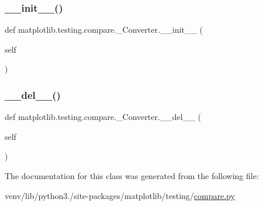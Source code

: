 \subsubsection{\texorpdfstring{\+\_\+\+\_\+init\+\_\+\+\_\+()}{\_\_init\_\_()}}
{\footnotesize\ttfamily def matplotlib.\+testing.\+compare.\+\_\+\+Converter.\+\_\+\+\_\+init\+\_\+\+\_\+ (\begin{DoxyParamCaption}\item[{}]{self }\end{DoxyParamCaption})}

\mbox{\label{classmatplotlib_1_1testing_1_1compare_1_1__Converter_a65e038b7478f498f342d8afc8e64fff7}} 
\subsubsection{\texorpdfstring{\+\_\+\+\_\+del\+\_\+\+\_\+()}{\_\_del\_\_()}}
{\footnotesize\ttfamily def matplotlib.\+testing.\+compare.\+\_\+\+Converter.\+\_\+\+\_\+del\+\_\+\+\_\+ (\begin{DoxyParamCaption}\item[{}]{self }\end{DoxyParamCaption})}



The documentation for this class was generated from the following file\+:\begin{DoxyCompactItemize}
\item 
venv/lib/python3./site-\/packages/matplotlib/testing/\hyperlink{compare_8py}{compare.\+py}\end{DoxyCompactItemize}
